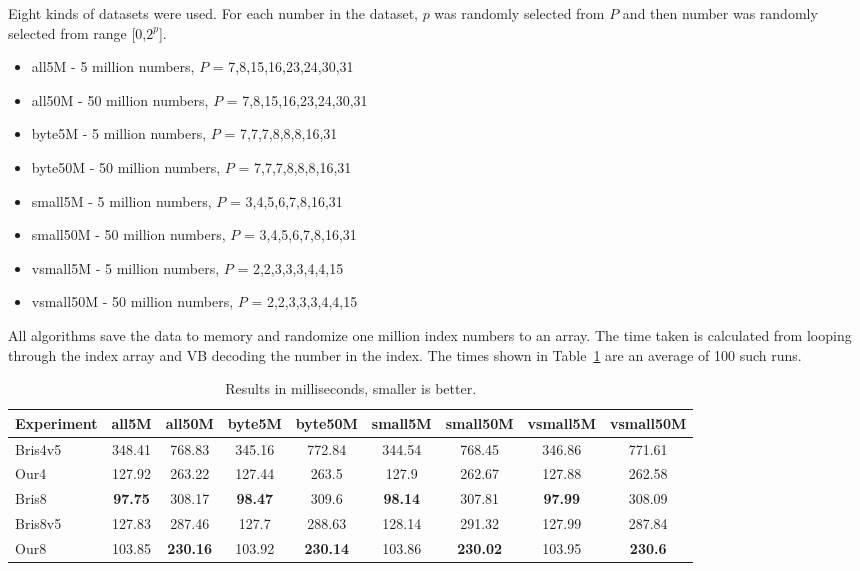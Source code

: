 Eight kinds of datasets were used. For each number in the dataset, $p$ was randomly selected from $P$ and then number was randomly selected from
range [0,$2^p$].

\begin{itemize}
  \item all5M - 5 million numbers, $P$ = {7,8,15,16,23,24,30,31}
  \item all50M - 50 million numbers, $P$ = {7,8,15,16,23,24,30,31}
  \item byte5M - 5 million numbers, $P$ = {7,7,7,8,8,8,16,31}
  \item byte50M - 50 million numbers, $P$ = {7,7,7,8,8,8,16,31}
  \item small5M - 5 million numbers, $P$ = {3,4,5,6,7,8,16,31}
  \item small50M - 50 million numbers, $P$ = {3,4,5,6,7,8,16,31}
  \item vsmall5M - 5 million numbers, $P$ = {2,2,3,3,3,4,4,15}
  \item vsmall50M - 50 million numbers, $P$ = {2,2,3,3,3,4,4,15}
\end{itemize}

All algorithms save the data to memory and randomize one million index numbers to an array. The time taken is calculated from looping through the 
index array and VB decoding the number in the index. The times shown in Table~\ref{table:results1} are an average of 100 such runs.

\begin{table}
\centering
\caption{Results in milliseconds, smaller is better.\label{table:results1}}
\begin{tabular}{l||c c c c c c c c} 
Experiment & all5M & all50M & byte5M & byte50M & small5M & small50M & vsmall5M & vsmall50M\\ 
\hline \hline 
Bris4v5 & 348.41 & 768.83 & 345.16 & 772.84 & 344.54 & 768.45 & 346.86 & 771.61 \\
Our4    & 127.92 & 263.22 & 127.44 & 263.5  & 127.9  & 262.67 & 127.88 & 262.58 \\
Bris8   & \textbf{97.75}  & 308.17 & \textbf{98.47}  & 309.6  & \textbf{98.14}  & 307.81 & \textbf{97.99}  & 308.09 \\
Bris8v5 & 127.83 & 287.46 & 127.7  & 288.63 & 128.14 & 291.32 & 127.99 & 287.84 \\
Our8    & 103.85 & \textbf{230.16} & 103.92 & \textbf{230.14} & 103.86 & \textbf{230.02} & 103.95 & \textbf{230.6} \\

\hline
%
\end{tabular}
\end{table}

